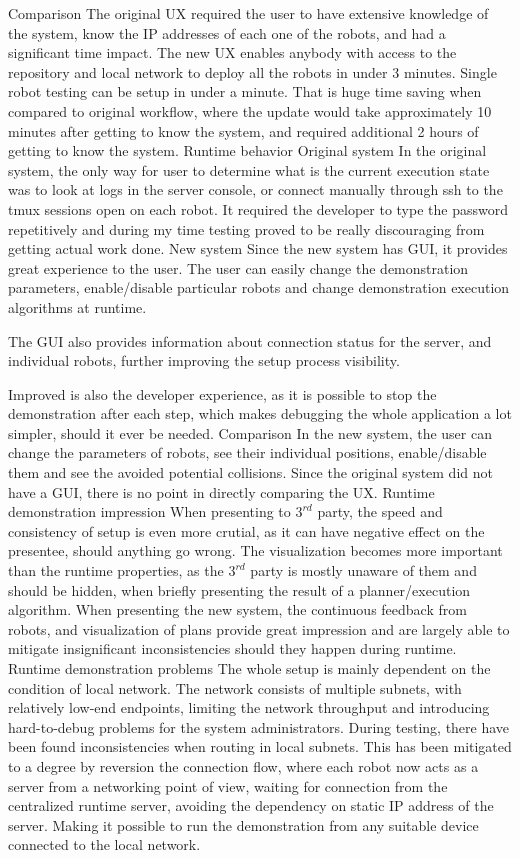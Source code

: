 \secc Comparison
The original UX required the user to have extensive knowledge of the system, know the IP addresses of each one of the robots, and had a significant time impact. The new UX enables anybody with access to the repository and local network to deploy all the robots in under 3 minutes. Single robot testing can be setup in under a minute. That is huge time saving when compared to original workflow, where the update would take approximately 10 minutes after getting to know the system, and required additional 2 hours of getting to know the system.
\sec Runtime behavior
\secc Original system
In the original system, the only way for user to determine what is the current execution state was to look at logs in the server console, or connect manually through ssh to the tmux sessions open on each robot. It required the developer to type the password repetitively and during my time testing proved to be really discouraging from getting actual work done.
\secc New system
Since the new system has GUI, it provides great experience to the user. The user can easily change the demonstration parameters, enable/disable particular robots and change demonstration execution algorithms at runtime.

The GUI also provides information about connection status for the server, and individual robots, further improving the setup process visibility.

Improved is also the developer experience, as it is possible to stop the demonstration after each step, which makes debugging the whole application a lot simpler, should it ever be needed.
\secc Comparison
In the new system, the user can change the parameters of robots, see their individual positions, enable/disable them and see the avoided potential collisions. Since the original system did not have a GUI, there is no point in directly comparing the UX. 
\sec Runtime demonstration impression
When presenting to $3^{rd}$ party, the speed and consistency of setup is even more crutial, as it can have negative effect on the presentee, should anything go wrong. The visualization becomes more important than the runtime properties, as the $3^{rd}$ party is mostly unaware of them and should be hidden, when briefly presenting the result of a planner/execution algorithm. When presenting the new system, the continuous feedback from robots, {\vicon} and visualization of plans provide great impression and are largely able to mitigate insignificant inconsistencies should they happen during runtime.
\sec Runtime demonstration problems
The whole setup is mainly dependent on the condition of local network. The network consists of multiple subnets, with relatively low-end endpoints, limiting the network throughput and introducing hard-to-debug problems for the system administrators. During testing, there have been found inconsistencies when routing in local subnets. This has been mitigated to a degree by reversion the connection flow, where each robot now acts as a server from a networking point of view, waiting for connection from the centralized runtime server, avoiding the dependency on static IP address of the server. Making it possible to run the demonstration from any suitable device connected to the local network.